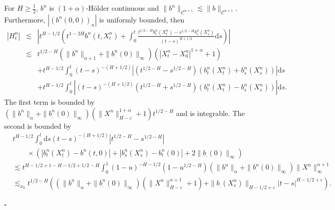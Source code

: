 \documentclass[a4paper,11pt]{article}
\newcommand{\mathd}{\mathrm{d}}
\newenvironment{proof}{{\sc Proof.}}{\hfill$\square$}
\newcommand{\CC}{\mathscr C}
\begin{document}
\begin{proof}
  For $H \geqslant \frac{1}{2}$, $b^{n}$ is $( 1+ \alpha)$-H\"older
  continuous and $\|b^{n} \|_{\CC^{\alpha +1}} \lesssim \|b\|_{\CC^{\alpha
  +1}}$. Furthermore, $|(b^{n} (0,0))_{n} |$ is uniformly bounded, then
  \begin{eqnarray*}
    | H_{t}^{n} | & \lesssim & \left\lvert t^{H-1/2}  \left( t^{1-2H} b^{n}
    (t,X^{n}_{t} )+ \int_{0}^{t} \frac{t^{1/2-H} b^{n}_{t} (X^{n}_{t}
    )-s^{1/2-H} b^{n}_{s} (X^{n}_{s} )}{(t-s)^{H+1/2}} \mathd s \right)
    \right\lvert\\
    & \lesssim & t^{1/2-H} ( \|b^{n} \|_{\alpha +1} + \| b^{n}_{.} ( 0 )
    \|_{\infty} ) (|X^{n}_{t} -X^{n}_{0} |^{1+ \alpha} +1)\\
    &  & +t^{H-1/2}  \int_{0}^{t} (t-s)^{- (H+1/2)}  | ( t^{1/2-H} -s^{1/2-H}
    )  ( b^{n}_{t} (X_{t}^{n} )+b^{n}_{s} (X_{s}^{n} ) ) | \mathd s\\
    &  & +t^{H-1/2}  \int_{0}^{t} | (t-s)^{-(H+1/2)}  ( t^{1/2-H} +s^{1/2-H}
    )  ( b^{n}_{t} (X_{t}^{n} )-b^{n}_{s} (X_{s}^{n} ) ) | \mathd s .
  \end{eqnarray*}
  The first term is bounded by $( \| b^{n} \|_{\alpha} + \| b^{n}_{.} ( 0 )
  \|_{\infty} ) ( \| X^{n} \|^{1+ \alpha}_{H- \varepsilon} +1) t^{1/2-H}$ and
  is integrable. The second is bounded by
  \begin{equation*}
  \begin{split}
   & t^{H-1/2}  \int_{0}^{t} \mathd s (t-s)^{- (H+1/2)} | t^{1/2-H}
     -s^{1/2-H} | \\ & \qquad \times ( | b^{n}_{t} (X_{t}^{n} )-b^{n} (t,0) | + | b^{n}_{s}
     (X_{s}^{n} )-b^{n}_{t} (0) | +2 \| b_{.} ( 0 ) \|_{\infty} )  
  \\ & \lesssim t^{H-1/2+1-H-1/2+1/2-H} \int_{0}^{1} ( 1-u )^{-H-1/2} (
     1-u^{1/2-H} ) ( \| b^{n} \|_{\alpha} + \| b^{n}_{.} ( 0 ) \|_{\infty} )
     \| X^{n} \|_{\infty}^{\alpha +1} 
  \\ & \lesssim_{x_{0}} t^{1/2-H} ( ( \| b^{n} \|_{\alpha} + \| b^{n}_{.} ( 0 )
     \|_{\infty} ) ( \| X^{n} \|_{H- \varepsilon}^{\alpha +1} +1 ) + \| b_{.}
     ( X^{n}_{s} ) \|_{H-1/2+ \varepsilon} | t-s |^{H-1/2+ \varepsilon} ). \end{split}
     \end{equation*}
  

\end{proof}
\end{document}
